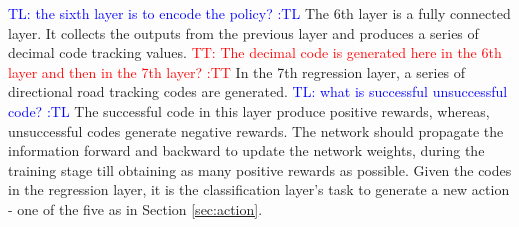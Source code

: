\documentclass{svproc}
\newcommand{\tl}[1]{\textcolor{blue} {TL: #1 :TL} }
\renewcommand{\tt}[1]{\textcolor{red} {TT: #1 :TT} }
\begin{document}
\tl{the sixth layer is to encode the policy?}
The 6th layer is a fully connected layer. It collects the outputs from the previous layer and produces a series of decimal code tracking values. \tt{The decimal code is generated here in the 6th layer and then in the 7th layer?}In the 7th regression layer, a series of directional road tracking codes are generated. \tl{what is successful unsuccessful code?} The successful code in this layer produce positive rewards, whereas, unsuccessful codes generate negative rewards. The network should propagate the information forward and backward to update the network weights, during the training stage till obtaining as many positive rewards as possible. Given the codes in the regression layer, it is the classification layer's task to generate a new action - one of the five as in Section \ref{sec:action}. 
\end{document}
